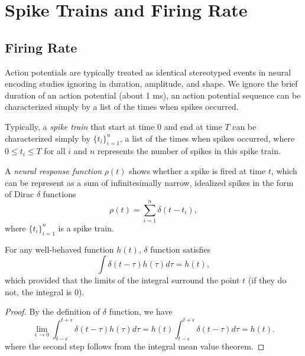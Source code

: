 
\section{Spike Trains and Firing Rate}
\label{sec:firing rate}

\subsection{Firing Rate}

\begin{asm}
  Action potentials are typically treated as identical 
  stereotyped events in neural encoding
  studies ignoring in duration, amplitude, and shape. 
  We ignore the brief duration of an action potential (about 1 ms),
  an action potential sequence can be characterized simply by a list of the
  times when spikes occurred.
\end{asm} 

\begin{ntn}
  Typically, a \emph{spike train} that start at time 0 and end at time $T$ can be characterized simply by $\{t_i\}_{i=1}^n$, a list of the times when spikes occurred, where $0\leq t_i\leq T$ for all $i$ and $n$ represents the number of spikes in this spike train.
\end{ntn}

\begin{defn}
  A \emph{neural response function} $\rho (t)$ shows whether a spike is fired at time $t$,
   which can be represent as a sum of infinitesimally narrow, 
  idealized spikes in the form of Dirac $\delta$ functions
  \begin{equation}
    \label{equ:1.1}
    \rho(t)=\sum_{i=1}^n\delta(t-t_i),
  \end{equation}
  where $\{t_i\}_{i=1}^n$ is a spike train.
\end{defn}

\begin{lem}
  For any well-behaved function $h(t)$, $\delta$ function satisfies
  \begin{equation}
    \label{equ:1.3}
    \int \delta(t-\tau)h(\tau)d\tau=h(t),
  \end{equation}
  which provided that the limits of the integral surround the point $t$ (if they do not, the integral is $0$).
  \begin{proof}
  By the definition of $\delta$ function, we have
  \begin{displaymath}
    \lim_{\epsilon\rightarrow 0}\int_{t - \epsilon}^{t + \epsilon} \delta(t-\tau)h(\tau)d\tau
    =h(t)\int_{t - \epsilon}^{t + \epsilon} \delta(t-\tau)d\tau=h(t).
  \end{displaymath}
  where the second step follows from the integral mean value theorem.
  \end{proof}
\end{lem}


